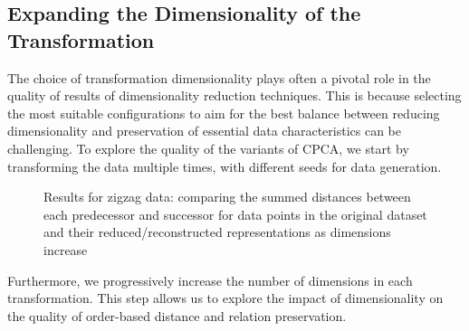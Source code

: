 \documentclass[pdftex,12pt,a4paper]{report}
\begin{document}
\subsection{Expanding the Dimensionality of the Transformation}

The choice of transformation dimensionality plays often a pivotal role in the quality of results of dimensionality reduction techniques.
This is because selecting the most suitable configurations to aim for the best balance between reducing dimensionality and preservation of essential data characteristics can be challenging.
To explore the quality of the variants of CPCA, we start by transforming the data multiple times, with different seeds for data generation.


\begin{figure}[htb!]
    \caption{Results for zigzag data: comparing the summed distances between each predecessor and successor for data points in the original dataset and their reduced/reconstructed representations as dimensions increase}\label{fig:cpca-avg_dev_vs_high_dim-zigzag}
\end{figure}
Furthermore, we progressively increase the number of dimensions in each transformation.
This step allows us to explore the impact of dimensionality on the quality of order-based distance and relation preservation.
\end{document}
